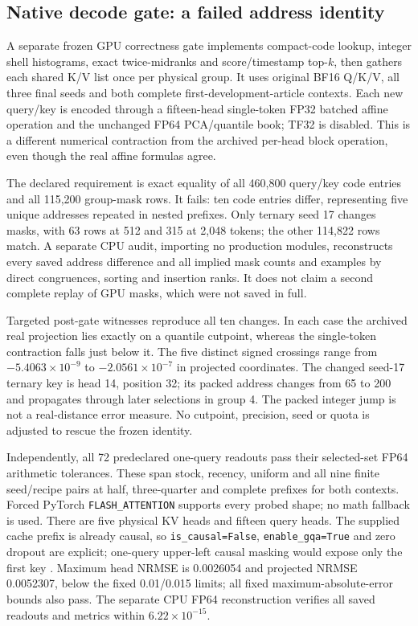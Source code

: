 \documentclass[11pt]{article}
\begin{document}
\subsection{Native decode gate: a failed address identity}
\label{sec:native-identity}

A separate frozen GPU correctness gate implements compact-code lookup,
integer shell histograms, exact twice-midranks and score/timestamp top-$k$,
then gathers each shared K/V list once per physical group. It uses original
BF16 Q/K/V, all three final seeds and both complete first-development-article
contexts. Each new query/key is encoded through a fifteen-head single-token
FP32 batched affine operation and the unchanged FP64 PCA/quantile book;
TF32 is disabled. This is a different numerical contraction from the archived
per-head block operation, even though the real affine formulas agree.

The declared requirement is exact equality of all 460,800 query/key code
entries and all 115,200 group-mask rows. It fails: ten code entries differ,
representing five unique addresses repeated in nested prefixes. Only ternary
seed 17 changes masks, with 63 rows at 512 and 315 at 2,048 tokens; the other
114,822 rows match. A separate CPU audit, importing no production modules,
reconstructs every saved address difference and all implied mask counts and
examples by direct congruences, sorting and insertion ranks. It does not
claim a second complete replay of GPU masks, which were not saved in full.

Targeted post-gate witnesses reproduce all ten changes. In each case the
archived real projection lies exactly on a quantile cutpoint, whereas the
single-token contraction falls just below it. The five distinct signed
crossings range from $-5.4063\times10^{-9}$ to
$-2.0561\times10^{-7}$ in projected coordinates. The changed seed-17 ternary
key is head 14, position 32; its packed address changes from 65 to 200 and
propagates through later selections in group 4. The packed integer jump is
not a real-distance error measure. No cutpoint, precision, seed or quota is
adjusted to rescue the frozen identity.

Independently, all 72 predeclared one-query readouts pass their selected-set
FP64 arithmetic tolerances. These span stock, recency, uniform and all nine
finite seed/recipe pairs at half, three-quarter and complete prefixes for
both contexts. Forced PyTorch \texttt{FLASH\_ATTENTION} supports every probed
shape; no math fallback is used. There are five physical KV heads and fifteen
query heads. The supplied cache prefix is already causal, so
\texttt{is\_causal=False}, \texttt{enable\_gqa=True} and zero dropout are
explicit; one-query upper-left causal masking would expose only the first
key \cite{pytorchsdpa}. Maximum head NRMSE is 0.0026054 and projected NRMSE
0.0052307, below the fixed 0.01/0.015 limits; all fixed maximum-absolute-error
bounds also pass. The separate CPU FP64 reconstruction verifies all saved
readouts and metrics within $6.22\times10^{-15}$.
\end{document}
